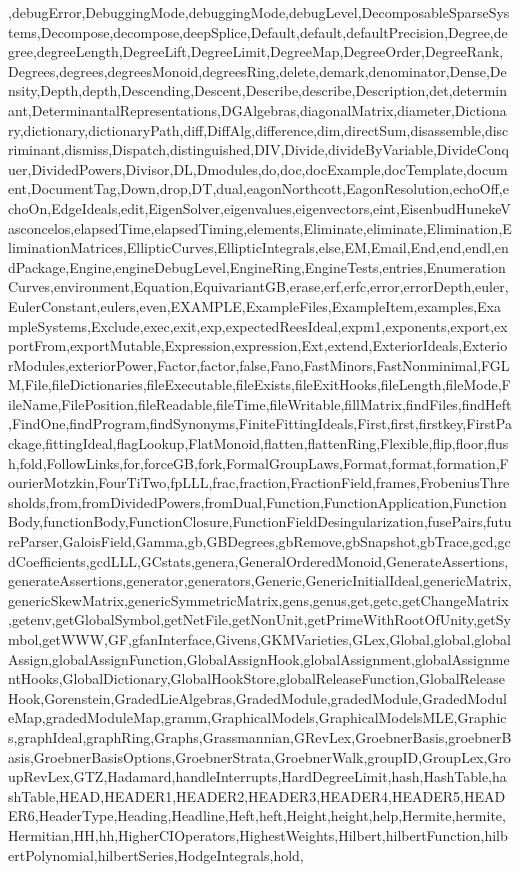 {,debugError,DebuggingMode,debuggingMode,debugLevel,DecomposableSparseSystems,Decompose,decompose,deepSplice,Default,default,defaultPrecision,Degree,degree,degreeLength,DegreeLift,DegreeLimit,DegreeMap,DegreeOrder,DegreeRank,Degrees,degrees,degreesMonoid,degreesRing,delete,demark,denominator,Dense,Density,Depth,depth,Descending,Descent,Describe,describe,Description,det,determinant,DeterminantalRepresentations,DGAlgebras,diagonalMatrix,diameter,Dictionary,dictionary,dictionaryPath,diff,DiffAlg,difference,dim,directSum,disassemble,discriminant,dismiss,Dispatch,distinguished,DIV,Divide,divideByVariable,DivideConquer,DividedPowers,Divisor,DL,Dmodules,do,doc,docExample,docTemplate,document,DocumentTag,Down,drop,DT,dual,eagonNorthcott,EagonResolution,echoOff,echoOn,EdgeIdeals,edit,EigenSolver,eigenvalues,eigenvectors,eint,EisenbudHunekeVasconcelos,elapsedTime,elapsedTiming,elements,Eliminate,eliminate,Elimination,EliminationMatrices,EllipticCurves,EllipticIntegrals,else,EM,Email,End,end,endl,endPackage,Engine,engineDebugLevel,EngineRing,EngineTests,entries,EnumerationCurves,environment,Equation,EquivariantGB,erase,erf,erfc,error,errorDepth,euler,EulerConstant,eulers,even,EXAMPLE,ExampleFiles,ExampleItem,examples,ExampleSystems,Exclude,exec,exit,exp,expectedReesIdeal,expm1,exponents,export,exportFrom,exportMutable,Expression,expression,Ext,extend,ExteriorIdeals,ExteriorModules,exteriorPower,Factor,factor,false,Fano,FastMinors,FastNonminimal,FGLM,File,fileDictionaries,fileExecutable,fileExists,fileExitHooks,fileLength,fileMode,FileName,FilePosition,fileReadable,fileTime,fileWritable,fillMatrix,findFiles,findHeft,FindOne,findProgram,findSynonyms,FiniteFittingIdeals,First,first,firstkey,FirstPackage,fittingIdeal,flagLookup,FlatMonoid,flatten,flattenRing,Flexible,flip,floor,flush,fold,FollowLinks,for,forceGB,fork,FormalGroupLaws,Format,format,formation,FourierMotzkin,FourTiTwo,fpLLL,frac,fraction,FractionField,frames,FrobeniusThresholds,from,fromDividedPowers,fromDual,Function,FunctionApplication,FunctionBody,functionBody,FunctionClosure,FunctionFieldDesingularization,fusePairs,futureParser,GaloisField,Gamma,gb,GBDegrees,gbRemove,gbSnapshot,gbTrace,gcd,gcdCoefficients,gcdLLL,GCstats,genera,GeneralOrderedMonoid,GenerateAssertions,generateAssertions,generator,generators,Generic,GenericInitialIdeal,genericMatrix,genericSkewMatrix,genericSymmetricMatrix,gens,genus,get,getc,getChangeMatrix,getenv,getGlobalSymbol,getNetFile,getNonUnit,getPrimeWithRootOfUnity,getSymbol,getWWW,GF,gfanInterface,Givens,GKMVarieties,GLex,Global,global,globalAssign,globalAssignFunction,GlobalAssignHook,globalAssignment,globalAssignmentHooks,GlobalDictionary,GlobalHookStore,globalReleaseFunction,GlobalReleaseHook,Gorenstein,GradedLieAlgebras,GradedModule,gradedModule,GradedModuleMap,gradedModuleMap,gramm,GraphicalModels,GraphicalModelsMLE,Graphics,graphIdeal,graphRing,Graphs,Grassmannian,GRevLex,GroebnerBasis,groebnerBasis,GroebnerBasisOptions,GroebnerStrata,GroebnerWalk,groupID,GroupLex,GroupRevLex,GTZ,Hadamard,handleInterrupts,HardDegreeLimit,hash,HashTable,hashTable,HEAD,HEADER1,HEADER2,HEADER3,HEADER4,HEADER5,HEADER6,HeaderType,Heading,Headline,Heft,heft,Height,height,help,Hermite,hermite,Hermitian,HH,hh,HigherCIOperators,HighestWeights,Hilbert,hilbertFunction,hilbertPolynomial,hilbertSeries,HodgeIntegrals,hold,}
